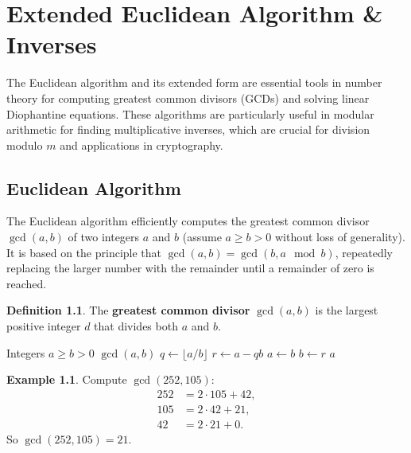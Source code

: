 \documentclass[12pt,openany]{book}
\theoremstyle{definition}
\newtheorem{definition}{Definition}[chapter]
\newtheorem{example}{Example}[chapter]
\theoremstyle{plain}
\theoremstyle{remark}
\begin{document}
\chapter{Extended Euclidean Algorithm \& Inverses}

The Euclidean algorithm and its extended form are essential tools in number theory for computing greatest common divisors (GCDs) and solving linear Diophantine equations. These algorithms are particularly useful in modular arithmetic for finding multiplicative inverses, which are crucial for division modulo $m$ and applications in cryptography.

\section{Euclidean Algorithm}

The Euclidean algorithm efficiently computes the greatest common divisor $\gcd(a, b)$ of two integers $a$ and $b$ (assume $a \geq b > 0$ without loss of generality). It is based on the principle that $\gcd(a, b) = \gcd(b, a \mod b)$, repeatedly replacing the larger number with the remainder until a remainder of zero is reached.

\begin{definition}
  The \textbf{greatest common divisor} $\gcd(a, b)$ is the largest positive integer $d$ that divides both $a$ and $b$.
\end{definition}

\begin{algorithm}[H]
\caption{Euclidean Algorithm}
\begin{algorithmic}[1]
\Require Integers $a \geq b > 0$
\Ensure $\gcd(a, b)$
  \State $q \gets \lfloor a / b \rfloor$ 
  \State $r \gets a - q b$ 
  \State $a \gets b$
  \State $b \gets r$
\EndWhile
\State \Return $a$
\end{algorithmic}
\end{algorithm}


\begin{example}
  Compute $\gcd(252, 105)$:
  \begin{align*}
    252 &= 2 \cdot 105 + 42, \\
    105 &= 2 \cdot 42 + 21, \\
    42 &= 2 \cdot 21 + 0.
  \end{align*}
  So $\gcd(252, 105) = 21$.
\end{example}

\newpage
\end{document}

